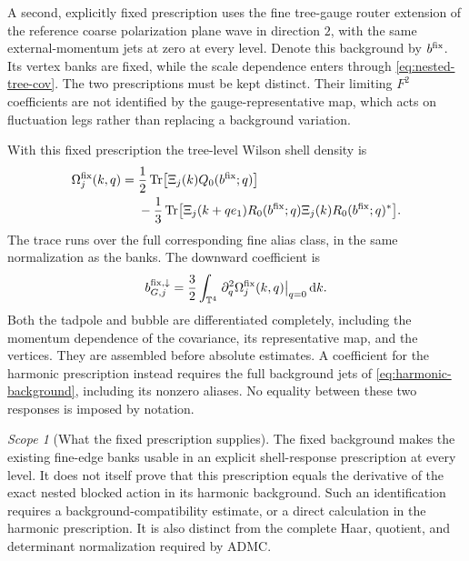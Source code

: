 \documentclass[11pt,oneside,openany]{book}
\theoremstyle{definition}
\theoremstyle{remark}
\newtheorem{scope}[scope]{Scope}
\newcommand{\T}{\mathbb T}
\newcommand{\dd}{\mathrm d}
\newcommand{\Tr}{\operatorname{Tr}}
\newcommand{\src}[2]{\cite[#2]{#1}}
\begin{document}
A second, explicitly fixed prescription uses the fine tree-gauge router
extension of the reference coarse polarization plane wave in direction
$2$, with the same external-momentum jets at zero at every level. Denote
this background by $b^{\rm fix}$. Its vertex banks are fixed, while the
scale dependence enters through \cref{eq:nested-tree-cov}. The two
prescriptions must be kept distinct. Their limiting $F^2$ coefficients
are not identified by the gauge-representative map, which acts on
fluctuation legs rather than replacing a background variation.
\src{F11}{V41}

With this fixed prescription the tree-level Wilson shell density is
\begin{equation}\label{eq:shell-functional}
\begin{aligned}
\Omega_j^{\rm fix}(k,q)
={}&\frac12\Tr\bigl[\Xi_j(k)Q_0(b^{\rm fix};q)\bigr]\\
&-\frac13\Tr\bigl[\Xi_j(k+qe_1)R_0(b^{\rm fix};q)
\Xi_j(k)R_0(b^{\rm fix};q)^*\bigr].
\end{aligned}
\end{equation}
The trace runs over the full corresponding fine alias class, in the same
normalization as the banks. The downward coefficient is
\begin{equation}\label{eq:b-shell}
b_{G,j}^{\mathrm{fix},\downarrow}
=\frac32\int_{\T^4}
\left.\partial_q^2\Omega_j^{\rm fix}(k,q)\right|_{q=0}\dd k.
\end{equation}
Both the tadpole and bubble are differentiated completely, including the
momentum dependence of the covariance, its representative map, and the
vertices. They are assembled before absolute estimates. A coefficient for
the harmonic prescription instead requires the full background jets of
\cref{eq:harmonic-background}, including its nonzero aliases. No equality
between these two responses is imposed by notation.

\begin{scope}[What the fixed prescription supplies]
The fixed background makes the existing fine-edge banks usable in an
explicit shell-response prescription at every level. It does not itself
prove that this prescription equals the derivative of the exact nested
blocked action in its harmonic background. Such an identification requires
a background-compatibility estimate, or a direct calculation in the
harmonic prescription. It is also distinct from the complete Haar,
quotient, and determinant normalization required by ADMC.
\end{scope}
\end{document}
